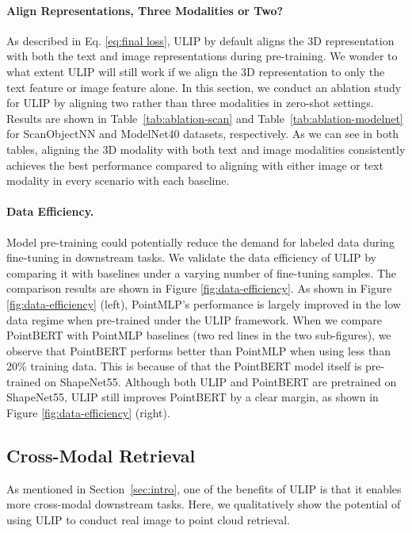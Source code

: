 \documentclass[10pt,twocolumn,letterpaper]{article}
\begin{document}
\paragraph{Align Representations, Three Modalities or Two?}
As described in Eq. \ref{eq:final loss}, ULIP by default aligns the 3D representation with both the text and image representations during pre-training.
We wonder to what extent ULIP will still work if we align the 3D representation to only the text feature or image feature alone.
In this section,
we conduct an ablation study for ULIP by aligning two rather than three modalities in zero-shot settings.
Results are shown in Table~\ref{tab:ablation-scan} and Table~\ref{tab:ablation-modelnet} for ScanObjectNN and ModelNet40 datasets, respectively. As we can see in both tables, aligning the 3D modality with both text and image modalities consistently achieves the best performance compared to aligning with either image or text modality in every scenario with each baseline.

\vspace{-10pt}
\paragraph{Data Efficiency.}
Model pre-training could potentially reduce the demand for labeled data during fine-tuning in downstream tasks. We validate the data efficiency of ULIP by comparing it with baselines under a varying number of fine-tuning samples. The comparison results are shown in Figure \ref{fig:data-efficiency}. As shown in Figure \ref{fig:data-efficiency} (left), PointMLP's performance is largely improved in the low data regime when pre-trained under the ULIP framework. When we compare PointBERT with PointMLP baselines (two red lines in the two sub-figures), we observe that PointBERT performs better than PointMLP when using less than 20\% training data. This is because of that the PointBERT model itself is pre-trained on ShapeNet55. Although both ULIP and PointBERT are pretrained on ShapeNet55, ULIP still improves PointBERT by a clear margin, as shown in Figure \ref{fig:data-efficiency} (right).







\subsection{Cross-Modal Retrieval}
As mentioned in Section~\ref{sec:intro}, one of the benefits of ULIP is that it enables more cross-modal downstream tasks. Here, we qualitatively show the potential of using ULIP to conduct real image to point cloud retrieval. 
\end{document}
